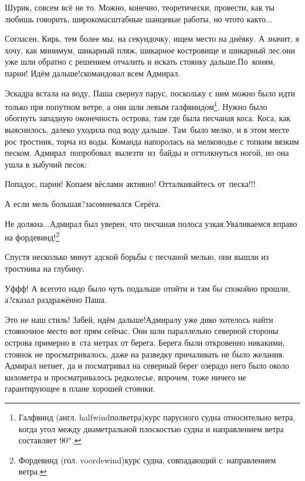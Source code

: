 \diagdash Шурик, совсем всё не то. Можно, конечно, теоретически, провести, как ты любишь говорить, широкомасштабные шанцевые работы, но что\sdash то как\sdash то$\ldots$

\diagdash Согласен, Кирь, тем более мы, на секундочку, ищем место на днёвку. А значит, я хочу, как минимум, шикарный пляж, шикарное костровище и шикарный лес.\mdash они уже шли обратно с решением отчалить и искать стоянку дальше.\mdash По~коням, парни! Идём дальше!\mdash скомандовал всем Адмирал.

\renewcommand*{\thefootnote}{\arabic{footnote}}
\setcounter{footnote}{0}
Эскадра встала на воду, Паша свернул парус, поскольку с ним можно было идти только при попутном ветре, а они шли левым галфвиндом\footnote{Галфвинд (англ. halfwind\mdash полветра)\mdash курс парусного судна относительно ветра, когда угол между диаметральной плоскостью судна и направлением ветра составляет $90\degree$\cite{МорскойСправочник}.}. Нужно было обогнуть западную оконечность острова, там где была песчаная коса. Коса, как выяснилось, далеко уходила под воду дальше. Там~было мелко, и в этом месте рос тростник, торча из воды. Команда напоролась на мелководье с топким вязким песком. Адмирал~попробовал~вылезти~из~байды и оттолкнуться ногой, но она ушла в зыбучий песок:

\diagdash Попадос, парни! Копаем вёслами активно! Отталкивайтесь от~песка!!!

\diagdash А если мель большая?\mdash засомневался Серёга.

\renewcommand*{\thefootnote}{\fnsymbol{footnote}}
\setcounter{footnote}{0}
\diagdash Не должна$\ldots$\mdash Адмирал был уверен, что песчаная полоса узкая.\mdash Уваливаемся вправо на фордевинд!\footnote{Фордевинд (гол. voordewind)\mdash курс судна, совпадающий с~направлением ветра\cite{МорскойСправочник}.}

Спустя несколько минут адской борьбы с песчаной мелью, они вышли из тростника на глубину:

\diagdash Уф\sdash ф\sdash ф! А всего\sdash то надо было чуть подальше отойти и там бы спокойно прошли, а?\mdash сказал раздражённо Паша.

\diagdash Это не наш стиль! Забей, идём дальше!\mdash Адмиралу уже дико хотелось найти стояночное место вот прям сейчас. Они шли параллельно северной стороны острова примерно в~ста метрах от берега. Берега были откровенно никакими, стоянок не просматривалось, даже на разведку причаливать не было желания. Адмирал нет\sdash нет, да и посматривал на северный берег озера\mdash до него было около километра и просматривалось редколесье, впрочем, тоже ничего не гарантирующее в плане хорошей стоянки.

